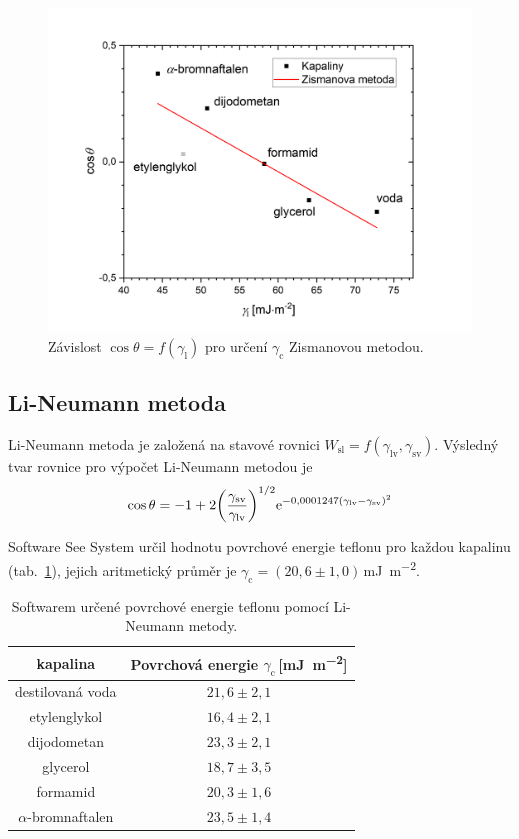\documentclass{protokol}
\begin{document}
\begin{figure}[h!]
	\centering
	\includegraphics[width=130mm]{zisman.png}
	\caption{Závislost $\cos\theta = 
		f\left(\gamma_{\text{l}} \right)$ pro určení $\gamma_{\text{c}}$ 
		Zismanovou metodou.}
	\label{graph:zisman}
\end{figure}
\newpage
\subsection{Li-Neumann metoda}
\par Li-Neumann metoda je založená na stavové rovnici 
$W_\text{sl}=f(\gamma_{\text{lv}},\gamma_{\text{sv}})$. Výsledný tvar rovnice 
pro výpočet Li-Neumann metodou je
\begin{equation}
	\cos\theta = -1 + 
	2 {\left( \frac{\gamma_{\text{sv}}} {\gamma_{\text{lv}}} \right)}^{1/2} 
	\mathrm{e}^{-0,0001247(\gamma_{\text{lv}} - \gamma_{\text{sv}})^2}
\end{equation}

Software See System určil hodnotu povrchové energie teflonu pro každou 
kapalinu (tab.~\ref{table:LiNeumann}), jejich aritmetický průměr je 
$\gamma_{\text{c}} = (20,6\pm1,0)$\,\si{\milli\joule\per\meter\squared}.

\begin{table}[h]
	\caption{Softwarem určené povrchové energie teflonu pomocí Li-Neumann 
	metody.}
	\label{table:LiNeumann}
	\begin{tabular}{|c|c|}\hline
		kapalina  & Povrchová energie 
		$\gamma_{\text{c}}$\,[\si{\milli\joule\per\meter\squared}] \\ \hline
		destilovaná voda & $21,6 \pm 2,1$     \\
		etylenglykol     & $16,4 \pm 2,1$     \\
		dijodometan      & $23,3 \pm 2,1$     \\
		glycerol         & $18,7 \pm 3,5$     \\
		formamid         & $20,3 \pm 1,6$     \\
		$\alpha$-bromnaftalen & $23,5 \pm 1,4$\\ \hline
	\end{tabular}
\end{table}
\end{document}
